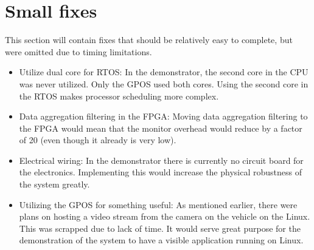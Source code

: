 
\section{Small fixes}
This section will contain fixes that should be relatively easy to complete, but were omitted due to timing limitations.

\begin{itemize}
\item Utilize dual core for RTOS: In the demonstrator, the second core in the CPU was never utilized. Only the GPOS used both cores. Using the second core in the RTOS makes processor scheduling more complex.

\item Data aggregation filtering in the FPGA: Moving data aggregation filtering to the FPGA would mean that the monitor overhead would reduce by a factor of 20 (even though it already is very low).

\item Electrical wiring: In the demonstrator there is currently no circuit board for the electronics. Implementing this would increase the physical robustness of the system greatly.

\item Utilizing the GPOS for something useful: As mentioned earlier, there were plans on hosting a video stream from the camera on the vehicle on the Linux. This was scrapped due to lack of time. It would serve great purpose for the demonstration of the system to have a visible application running on Linux.



\end{itemize}
